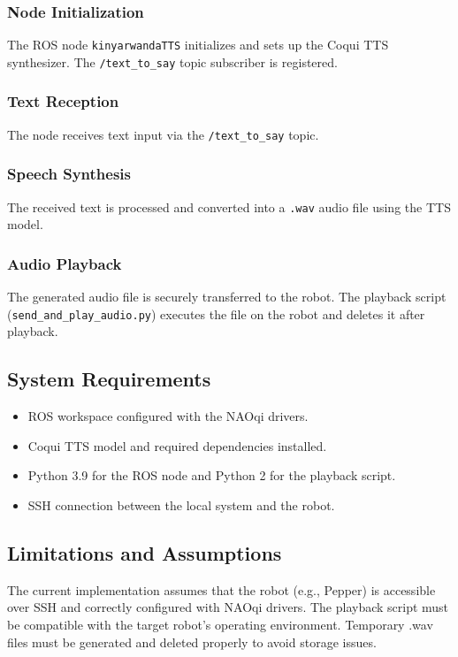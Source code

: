 \documentclass{CSSRforAfrica}
\begin{document}
\subsubsection{Node Initialization}
The ROS node \texttt{kinyarwandaTTS} initializes and sets up the Coqui TTS synthesizer. The \texttt{/text\_to\_say} topic subscriber is registered.

\subsubsection{Text Reception}
The node receives text input via the \texttt{/text\_to\_say} topic.

\subsubsection{Speech Synthesis}
The received text is processed and converted into a \texttt{.wav} audio file using the TTS model.

\subsubsection{Audio Playback}
The generated audio file is securely transferred to the robot. The playback script (\texttt{send\_and\_play\_audio.py}) executes the file on the robot and deletes it after playback.

\subsection{System Requirements}
\begin{itemize}
    \item ROS workspace configured with the NAOqi drivers.
    \item Coqui TTS model and required dependencies installed.
    \item Python 3.9 for the ROS node and Python 2 for the playback script.
    \item SSH connection between the local system and the robot.
\end{itemize}

\subsection{Limitations and Assumptions}

    The current implementation assumes that the robot (e.g., Pepper) is accessible over SSH and correctly configured with NAOqi drivers.
    The playback script must be compatible with the target robot's operating environment.
    Temporary .wav files must be generated and deleted properly to avoid storage issues.
\end{document}
